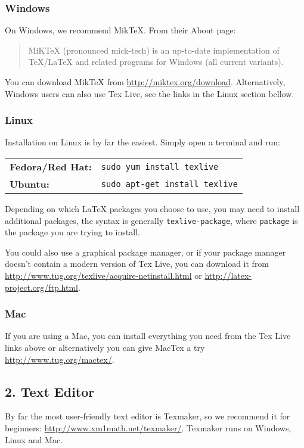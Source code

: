 \documentclass[a4paper]{article}
\begin{document}
\subsubsection*{Windows}
On Windows, we recommend MikTeX.  From their About page:
\begin{quote}
MiKTeX (pronounced mick-tech) is an up-to-date implementation
of TeX/LaTeX and related programs for Windows (all current variants).
\end{quote}

You can download MikTeX from \url{http://miktex.org/download}.
Alternatively, Windows users can also use Tex Live, see the links
in the Linux section bellow.

\subsubsection*{Linux}
Installation on Linux is by far the easiest.  Simply open a
terminal and run:

\begin{center}
\begin{tabular}{ll}
\textbf{Fedora/Red Hat:} & \verb|sudo yum install texlive| \\
\textbf{Ubuntu:} & \verb|sudo apt-get install texlive|
\end{tabular}
\end{center}

Depending on which LaTeX packages you choose to use, you may need to
install additional packages, the syntax is generally \verb|texlive-package|,
where \verb|package| is the package you are trying to install.

You could also use a graphical package manager, or if your package
manager doesn't contain a modern version of Tex Live, you can
download it from \url{http://www.tug.org/texlive/acquire-netinstall.html}
or \url{http://latex-project.org/ftp.html}.

\subsubsection*{Mac}
If you are using a Mac, you can install everything you need
from the Tex Live links above or alternatively you can give MacTex a
try \url{http://www.tug.org/mactex/}.

\subsection*{2. Text Editor}
By far the most user-friendly text editor is Texmaker, so we
recommend it for beginners: \url{http://www.xm1math.net/texmaker/}.
Texmaker runs on Windows, Linux and Mac.
\end{document}
